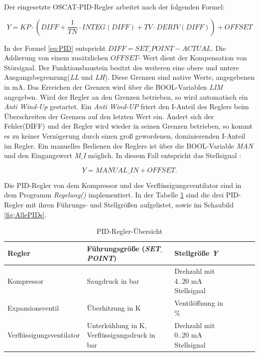 Der eingesetzte OSCAT-PID-Regler arbeitet nach der folgenden Formel:

\begin{equation}
 Y = KP \cdot (DIFF + \frac{1}{TN} \cdot INTEG(DIFF) + TV \cdot DERIV(DIFF)) + OFFSET
 \label{eq:PID}
\end{equation}

In der Formel \ref{eq:PID} entspricht $DIFF = SET\_POINT - ACTUAL$.  Die Addierung von einem zusätzlichen $OFFSET$- Wert dient der Kompensation von Störsignal. Der Funktionsbaustein besitzt des weiteren eine obere und untere Ausgangsbegrenzung(\textit{LL} und \textit{LH}). Diese Grenzen sind native Werte, angegebenen in mA. Das Erreichen der Grenzen wird über die BOOL-Variablen \textit{LIM} angegeben. Wird der Regler an den Grenzen betrieben, so wird automatisch ein \textit{Anti Wind-Up} gestartet. Ein \textit{Anti Wind-UP} friert den I-Anteil des Reglers beim Überschreiten der Grenzen auf den letzten Wert ein. Ändert sich der Fehler(DIFF) und der Regler wird wieder in seinen Grenzen betrieben, so kommt es zu keiner Verzögerung durch einen groß gewordenen, dominierenden I-Anteil im Regler. Ein manuelles Bedienen des Reglers ist über die BOOL-Variable \textit{MAN} und den Eingangswert \textit{M$\_$I} möglich. In diesem Fall entspricht das Stellsignal :

\begin{equation}
Y = MANUAL\_IN + OFFSET. 
\end{equation}


Die PID-Regler von dem Kompressor und des Verflüssigungsventilator sind in dem Programm \textit{Regelung()} implementiert.  In der Tabelle \ref{tab:Regler_Uebersicht} sind die drei PID-Regler mit ihren Führungs- und Stellgrößen aufgelistet, sowie im Schaubild \ref{fig:AllePIDs}. 


\begin{table}[htb]
\centering
\caption{PID-Regler-Übersicht}\vspace{6pt}
\begin{tabular}{p{3.8cm}p{3.9cm}p{5.3cm}lll} 
\hline 
\textbf{Regler} & \textbf{Führungsgröße (\textit{SET$\_$POINT})} & \textbf{Stellgröße \textit{Y}} \\
\hline 
\hline
Kompressor & Saugdruck in bar & Drehzahl mit 4..20 mA Stellsignal \\ 
\hline 
Expansionsventil & Überhitzung in K & Ventilöffnung in $\%$ \\ 
\hline 
Verflüssigungsventilator & Unterkühlung in K, Verflüssigungsdruck in bar & Drehzahl mit 0..20 mA Stellsignal \\ 
\hline 
\hline
\end{tabular} 
\label{tab:Regler_Uebersicht}
\end{table}

